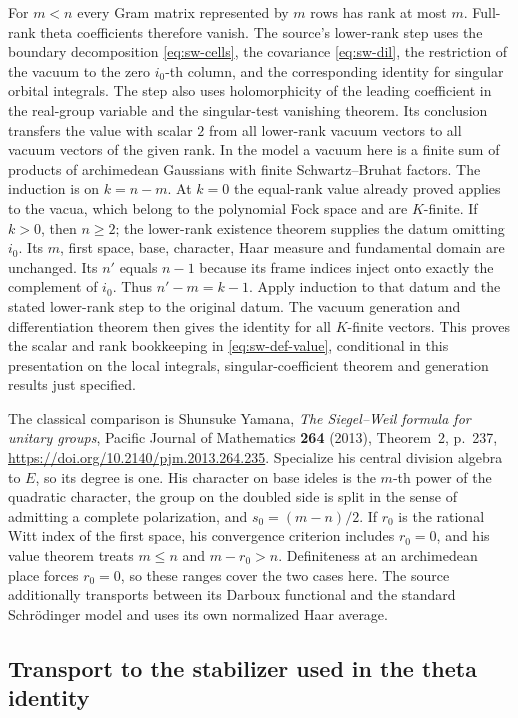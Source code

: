 For \(m<n\) every Gram matrix represented by \(m\) rows has rank
at most \(m\). Full-rank theta coefficients therefore vanish.
The source's lower-rank step uses the boundary decomposition
\eqref{eq:sw-cells}, the covariance \eqref{eq:sw-dil}, the
restriction of the vacuum to the zero \(i_0\)-th column, and
the corresponding identity for singular orbital integrals.
The step also uses holomorphicity of the leading coefficient in
the real-group variable and the singular-test vanishing theorem.
Its conclusion transfers the value with scalar \(2\) from all
lower-rank vacuum vectors to all vacuum vectors of the given rank.
In the model a vacuum here is a finite sum of products of
archimedean Gaussians with finite Schwartz--Bruhat factors.
The induction is on \(k=n-m\). At \(k=0\) the equal-rank value
already proved applies to the vacua, which belong to the polynomial
Fock space and are \(K\)-finite. If \(k>0\), then \(n\geq2\); the
lower-rank existence theorem supplies the datum omitting \(i_0\).
Its \(m\), first space, base, character, Haar measure and
fundamental domain are unchanged. Its \(n'\) equals \(n-1\)
because its frame indices inject onto exactly the complement of
\(i_0\). Thus \(n'-m=k-1\). Apply induction to that datum and the
stated lower-rank step to the original datum. The vacuum generation
and differentiation theorem then gives the identity for all
\(K\)-finite vectors. This proves the scalar and rank bookkeeping
in \eqref{eq:sw-def-value}, conditional in this presentation on
the local integrals, singular-coefficient theorem and generation
results just specified.

The classical comparison is Shunsuke Yamana, \emph{The Siegel--Weil
formula for unitary groups}, Pacific Journal of Mathematics
\textbf{264} (2013), Theorem~2, p.~237,
\url{https://doi.org/10.2140/pjm.2013.264.235}.
Specialize his central division algebra to \(E\), so its degree is
one. His character on base ideles is the \(m\)-th power of the
quadratic character, the group on the doubled side is split in
the sense of admitting a complete polarization, and \(s_0=(m-n)/2\).
If \(r_0\) is the rational Witt index of the first space, his
convergence criterion includes \(r_0=0\), and his value theorem
treats \(m\leq n\) and \(m-r_0>n\). Definiteness at an
archimedean place forces \(r_0=0\), so these ranges cover the two
cases here. The source additionally transports between its Darboux
functional and the standard Schr\"odinger model and uses its own
normalized Haar average.

\subsection{Transport to the stabilizer used in the theta identity}

